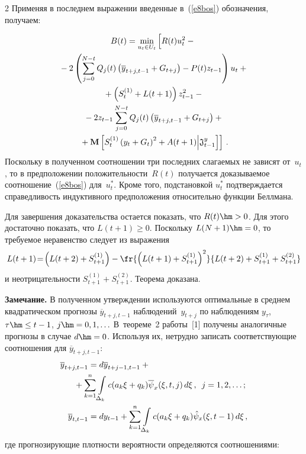 \begin{multicols}{2}
Применяя в последнем выражении введенные в~(\ref{e8bos}) обозначения, получаем:

\noindent
\begin{multline*}
B(t) =\min\limits_{u_t\in U_t}\left[ \vphantom{S_t^{(1)}}
R(t) u_t^2 -{}\right.\\
{}-2\left( \sum\limits_{j=0}^{N-t} Q_j(t) \left( \overline{y}_{t+j,t-1}+G_{t+j}\right) -
P(t)z_{t-1}\right) u_t+{}\\
{}+ \left(
S_t^{(1)}+L(t+1)\right) z^2_{t-1}-{}\\
{}- 2z_{t-1} \sum\limits_{j=0}^{N-t} Q_j(t)
\left( \overline{y}_{t+j,t-1}+G_{t+j}\right) +{}\\
\left.{}+\mathbf{M}\left[
S_t^{(1)} \left( y_t+G_t\right)^2+A(t+1)\Big\vert \mathfrak{J}^y_{t-1}\right]\right]\,.
\end{multline*}
    Поскольку в полученном соотношении три последних слагаемых не зависят от~$u_t$, то в 
предположении положительности~$R(t)$ получается доказываемое 
соотношение~(\ref{e8bos}) для~$u_t^*$. Кроме того, \mbox{подстановкой} $u_t^*$ подтверждается 
справедливость индуктивного предположения относительно функции Беллмана.
  
  Для завершения доказательства остается показать, что $R(t)\hm>0$. Для этого достаточно 
показать, что $L(t+1)\geq 0$. Поскольку $L(N+1)\hm=0$, то требуемое неравенство следует 
из выражения
  $$
  L(t+1)\! =\!\left( L(t+2)+S_{t+1}^{(1)}\right) -\fr{\left( L(t+1)+S^{(1)}_{t+1}\right)^2}
  {L(t+2)+S_{t+1}^{(1)}+S^{(2)}_{t+1}}
  $$
и неотрицательности $S_{t+1}^{(1)}+S_{t+1}^{(2)}$. Теорема доказана.
  
  \medskip
  
  \noindent
  \textbf{Замечание.} В полученном утверждении используются оптимальные в среднем 
квадратическом прогнозы $\overline{y}_{t+j,t-1}$ наблюдений~$y_{t+j}$ по наблюдениям 
$y_\tau$, $\tau\hm\leq t-1$, $j\hm=0,1,\ldots$ В~теореме~2 работы~[1] получены аналогичные 
прогнозы в случае $d\hm=0$. Используя их, нетрудно записать соответствующие 
соотношения для $\overline{y}_{t+j,t-1}$:
  \begin{align*}
  \overline{y}_{t+j,t-1} &= d\overline{y}_{t+j-1,t-1}+{}\\
  &\hspace*{-6mm}{}+\sum\limits_{k=1}^n \int\limits_{\Delta_k}
  c(a_k\xi+q_k)\overline{\psi}_x (\xi,t,j)\,d\xi\,,\enskip j=1,2,\ldots;\\
  \overline{y}_{t,t-1} &= dy_{t-1}+\sum\limits_{k=1}^n \int\limits_{\Delta_k} c( a_k\xi + q_k) 
\hat{\psi}_x (\xi,t-1)\,d\xi\,,
  \end{align*}
где прогнозирующие плотности вероятности определяются соотношениями:


\end{multicols}
